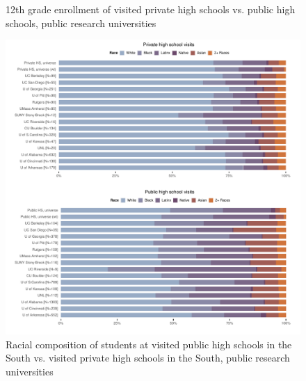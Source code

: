 \documentclass[
  12pt,
]{article}
\begin{document}
\begin{landscape}
\begin{figure}
{}

\caption{12th grade enrollment of visited private high schools vs. public high schools, public research universities}\label{fig:enroll-pubu-privhs-pubhs}
\end{figure}

\newpage

\begin{figure}

{\centering \includegraphics[width=2\linewidth]{./south_race_comp_pubu_privhs_pubhs} 

}

\caption{Racial composition of students at visited public high schools in the South vs. visited private high schools in the South, public research universities}\label{fig:south-race-comp-pubu-privhs-pubhs}
\end{figure}

\newpage

\begin{figure}


\end{figure}
\end{landscape}
\end{document}
